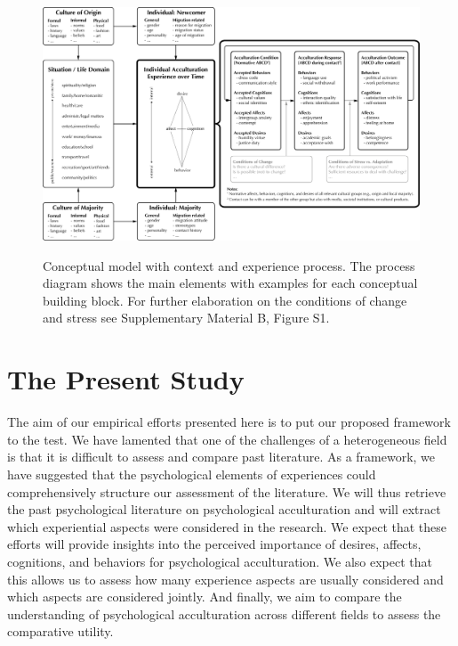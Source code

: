 \documentclass[man, 12pt, a4paper, mask]{apa7}
\newcommand\Warning[1][2ex]{%
  \renewcommand\stacktype{L}%
  \scaleto{\stackon[1.3pt]{\color{red}$\triangle$}{\tiny\bfseries !}}{#1}}%
\begin{document}

\begin{figure}
    \centering
    \caption{Conceptual model with context and experience process. The process diagram shows the main elements with examples for each conceptual building block. For further elaboration on the conditions of change and stress see Supplementary Material B, Figure S1.}
    \includegraphics[width=\textwidth]{Figures/ConceptualFrameworkExpandedOptima_short.pdf}
    \label{fig:ModelContext}
\end{figure}

\section{The Present Study}


The aim of our empirical efforts presented here is to put our proposed framework to the test. We have lamented that one of the challenges of a heterogeneous field is that it is difficult to assess and compare past literature. As a framework, we have suggested that the psychological elements of experiences could comprehensively structure our assessment of the literature. We will thus retrieve the past psychological literature on psychological acculturation and will extract which experiential aspects were considered in the research. We expect that these efforts will provide insights into the perceived importance of desires, affects, cognitions, and behaviors for psychological acculturation. We also expect that this allows us to assess how many experience aspects are usually considered and which aspects are considered jointly. And finally, we aim to compare the understanding of psychological acculturation across different fields to assess the comparative utility. 
\end{document}
